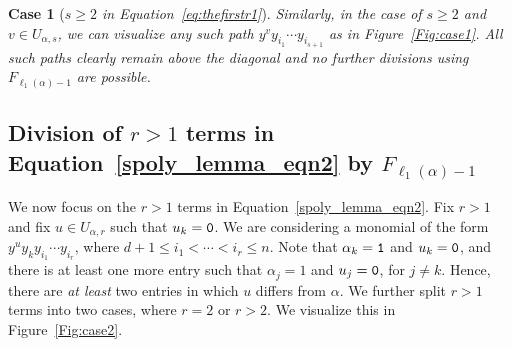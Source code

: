 \documentclass[10pt,a4paper]{article}
\newcounter{casecount}  \setcounter{casecount}{0}
\newtheorem{case}[casecount]{Case}
\begin{document}
\begin{case}[{\it $s \geq 2$ in Equation~\eqref{eq:thefirstr1}}\null] \label{rgeq2}
    Similarly, in the case of $s \geq 2$ and $v \in U_{\alpha, s}$, we can visualize any such path $y^{v}y_{i_1} \cdots y_{i_{s+1}}$ as in Figure~\ref{Fig:case1}.
All such paths clearly remain above the diagonal and no further divisions using $F_{\ell_1(\alpha)-1}$ are possible.
\end{case}	

\subsection{Division of $r>1$ terms in Equation~\eqref{spoly_lemma_eqn2} by $F_{\ell_1(\alpha)-1}$} \label{beta_redu}
We now focus on the  $r>1$ terms in Equation~\eqref{spoly_lemma_eqn2}. 
Fix $r>1$ and fix $u \in U_{\alpha, r}$ such that $u_k=\textnormal{\texttt{0}}$. We are considering a monomial of the form 
$y^{u}y_k y_{i_1} \cdots y_{i_{r}}  $, where $d+1 \leq i_1 < \cdots < i_r \leq n$.
Note that $\alpha_k = \textnormal{\texttt{1}}$ and $u_k =\textnormal{\texttt{0}}$, and there is at least one more entry such that $\alpha_j = 1$ and $u_j = \textnormal{\texttt{0}}$, for $j \ne k$. Hence, there are \textit{at least} two entries in which $u$ differs from $\alpha$. We further split $r>1$ terms into two cases, where $r=2$ or $r>2$.
We visualize this in Figure~\ref{Fig:case2}.
\end{document}
